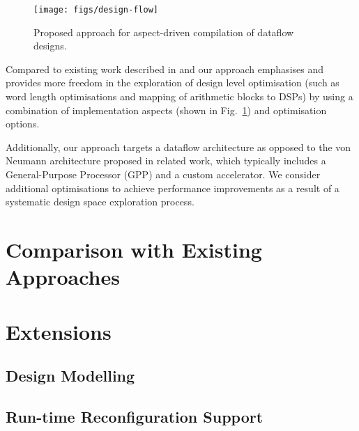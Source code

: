 \begin{figure}[!h]
  \texttt{[image: figs/design-flow]}
  \caption{Proposed approach for aspect-driven compilation of dataflow
    designs.}
  \label{fig:design-flow}
\end{figure}

Compared to existing work described in
\cite{Cardoso:Teixeira:Alves:Nobre:Diniz:Cutinho:Luk:2012} and
\cite{cardoso2011new} our approach emphasises and provides more
freedom in the exploration of design level optimisation (such as word
length optimisations and mapping of arithmetic blocks to DSPs) by
using a combination of implementation aspects (shown in
Fig.~\ref{fig:design-flow}) and \FAST{} optimisation options.

Additionally, our approach targets a dataflow architecture as opposed
to the von Neumann architecture proposed in related work, which
typically includes a General-Purpose Processor (GPP) and a custom
accelerator. We consider additional optimisations to achieve
performance improvements as a result of a systematic design space
exploration process.

\section{Comparison with Existing Approaches}

\section{Extensions}

\subsection{Design Modelling}

\subsection{Run-time Reconfiguration Support}
